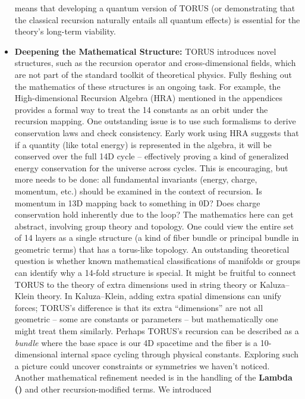 \documentclass[
]{article}
\begin{document}
\begin{itemize}
  means that developing a quantum version of TORUS (or demonstrating
  that the classical recursion naturally entails all quantum effects) is
  essential for the theory's long-term viability.
\item
  \textbf{Deepening the Mathematical Structure:} TORUS introduces novel
  structures, such as the recursion operator and cross-dimensional
  fields, which are not part of the standard toolkit of theoretical
  physics. Fully fleshing out the mathematics of these structures is an
  ongoing task. For example, the High-dimensional Recursion Algebra
  (HRA) mentioned in the appendices provides a formal way to treat the
  14 constants as an orbit under the recursion mapping\hspace{0pt}. One
  outstanding issue is to use such formalisms to derive conservation
  laws and check consistency. Early work using HRA suggests that if a
  quantity (like total energy) is represented in the algebra, it will be
  conserved over the full 14D cycle\hspace{0pt} -- effectively proving a
  kind of generalized energy conservation for the universe across
  cycles. This is encouraging, but more needs to be done: all
  fundamental invariants (energy, charge, momentum, etc.) should be
  examined in the context of recursion. Is momentum in 13D mapping back
  to something in 0D? Does charge conservation hold inherently due to
  the loop? The mathematics here can get abstract, involving group
  theory and topology. One could view the entire set of 14 layers as a
  single structure (a kind of fiber bundle or principal bundle in
  geometric terms) that has a torus-like topology. An outstanding
  theoretical question is whether known mathematical classifications of
  manifolds or groups can identify why a 14-fold structure is special.
  It might be fruitful to connect TORUS to the theory of extra
  dimensions used in string theory or Kaluza--Klein theory. In
  Kaluza--Klein, adding extra spatial dimensions can unify forces;
  TORUS's difference is that its extra ``dimensions'' are not all
  geometric -- some are constants or parameters -- but mathematically
  one might treat them similarly. Perhaps TORUS's recursion can be
  described as a \emph{bundle} where the base space is our 4D spacetime
  and the fiber is a 10-dimensional internal space cycling through
  physical constants. Exploring such a picture could uncover constraints
  or symmetries we haven't noticed. Another mathematical refinement
  needed is in the handling of the \textbf{Lambda (\Lambda)} and other
  recursion-modified terms. We introduced

\end{itemize}
\end{document}
